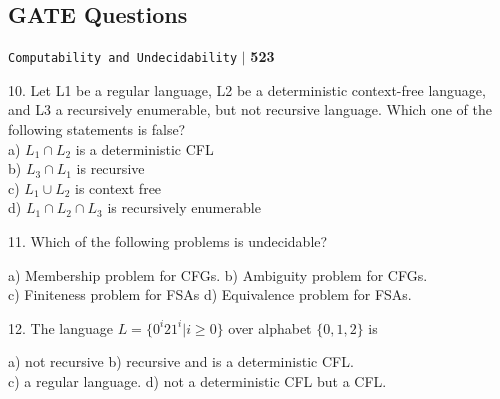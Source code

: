 \documentclass[8pt]{beamer}
\begin{document}
\begin{frame}
 \section*{GATE Questions}
\begin{flushright}
 \texttt{Computability and Undecidability} \hspace*{0.1cm}\textbf{$|$} \hspace*{0.1cm} \textbf{523}\hspace*{0.1cm}
\end{flushright}
\vspace*{0.5cm}

\hspace*{-0.4cm}
10. Let L1 be a regular language, L2 be a deterministic context-free language, and L3 a recursively
enumerable, but not recursive language. Which one of the following statements is false?\\

\vspace*{0.1cm}
\hspace*{0.5cm} a) $L _{1} \cap L _{2}$ is a deterministic CFL\\
\hspace*{0.5cm} b) $L _{3} \cap L _{1}$ is recursive\\
\hspace*{0.5cm} c) $L _{1} \cup L _{2}$ is context free\\
\hspace*{0.5cm} d) $L _{1} \cap L _{2} \cap L _{3}$ is recursively enumerable\\
\vspace*{0.2cm} 

\hspace*{-0.4cm}
11. Which of the following problems is undecidable?\\
\vspace*{0.1cm}

\hspace*{0.5cm} a) Membership problem for CFGs. \hspace*{1cm} b) Ambiguity problem for CFGs.\\
\hspace*{0.5cm} c) Finiteness problem for FSAs  \hspace*{1.4cm} d) Equivalence problem for FSAs.\\
\vspace*{0.2cm}

\hspace*{-0.4cm}
12. The language $L = \{0 ^{i} 21 ^{i} | i \geq 0\}$ over alphabet $\{0, 1, 2\}$ is\\
\vspace*{0.1cm}

\hspace*{0.5cm} a) not recursive  \hspace*{1.8cm} b) recursive and is a deterministic CFL.\\
\hspace*{0.5cm} c) a regular language. \hspace*{1cm}  d) not a deterministic CFL but a CFL.\\
\vspace*{0.2cm}
\end{frame}
\end{document}
